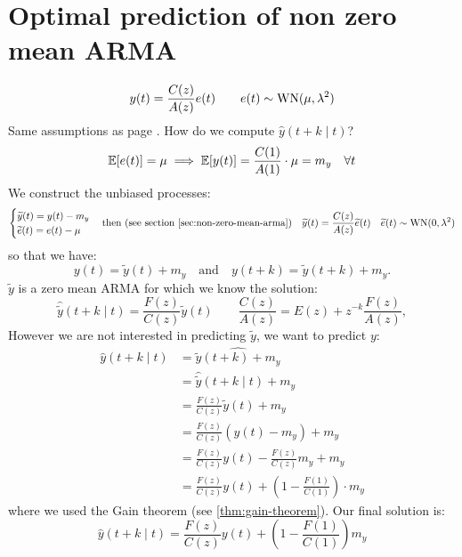 \section{Optimal prediction of non zero mean ARMA}
\[
	y(t)=\frac{C(z)}{A(z)}e(t)\qquad e(t)\sim \operatorname{WN}(\mu,\lambda^2 )
\]
Same assumptions as page \pageref{assumptions-prediction-theory}. How do we compute $\hat y(t+k\mid t)$?
\[
	\mathbb{E}[e(t)] = \mu \implies \mathbb{E}[y(t)]=\frac{C(1)}{A(1)}\cdot\mu=m_{y} \quad \forall t
\]
We construct the unbiased processes:
\[
	\begin{cases}
		\widetilde y(t)=y(t)-m_{y}\\
		\widetilde e(t)=e(t)-\mu
	\end{cases}
	\text{then (see section \ref{sec:non-zero-mean-arma})}
	\quad
	\widetilde y(t)=\frac{C(z)}{A(z)}\widetilde e(t) \quad \widetilde e(t)\sim \operatorname{WN}(0,\lambda^2)
\]
so that we have:
\[
	y(t)=\tilde y(t)+m_{y} \quad\text{and}\quad y(t+k)=\tilde y(t+k)+m_{y}.
\]
$\tilde y$ is a zero mean ARMA for which we know the solution:
\[
	\hat{\tilde y} (t+k\mid t) = \frac{F(z)}{C(z)}\tilde y(t) \qquad \frac{C(z)}{A(z)}=E(z)+z^{-k}\frac{F(z) }{A(z)},
\]
However we are not interested in predicting $\tilde y$, we want to predict $y$:
\begin{align*}
	\hat y(t+k\mid t)&=\widehat{\tilde y(t+k)+m_{y}}\\
	&= \hat{\tilde y}(t+k\mid t)+m_{y}\\
	&=\frac{F(z)}{C(z)}\tilde y(t)+m_{y}\\
	&=\frac{F(z)}{C(z)}(y(t)-m_{y})+m_{y}\\
	&=\frac{F(z)}{C(z)}y(t)-\frac{F(z)}{C(z)}m_{y}+m_{y}\\
	&=\frac{F(z)}{C(z)}y(t)+\left( 1-\frac{F(1)}{C(1)} \right)  \cdot m_{y}
\end{align*}
where we used the Gain theorem (see \ref{thm:gain-theorem}). Our final solution is:
\[
	\boxed{\hat y(t+k\mid t) = \frac{F(z)}{C(z)}y(t)+\left( 1-\frac{F(1)}{C(1)} \right) m_{y}}
\]